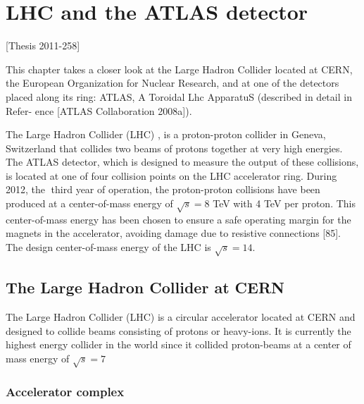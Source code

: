 \chapter{LHC and the ATLAS detector }\label{chap:lhc}

[Thesis 2011-258]

This chapter  takes a closer look at the Large Hadron Collider located at CERN,
the European Organization for Nuclear Research, and at one of the detectors placed
along its ring: ATLAS, A Toroidal Lhc ApparatuS (described in detail in Refer-
ence [ATLAS Collaboration 2008a]).


The Large Hadron Collider (LHC) \cite{lhc1}, \cite{lhc2} is a proton-proton collider in Geneva,
Switzerland that collides two beams of protons together at very high energies. The ATLAS
detector, which is designed to measure the output of these collisions, is located at one of
four collision points on the LHC accelerator ring. During 2012, the third year of operation,
the proton-proton collisions have been produced at a center-of-mass energy of $\sqrt{s}= 8$ TeV
with 4 TeV per proton. This center-of-mass energy has been chosen to ensure a safe
operating margin for the magnets in the accelerator, avoiding damage due to resistive
connections [85]. The design center-of-mass energy of the LHC is $\sqrt{s}= 14$.


\section{The Large Hadron Collider at CERN}
The Large Hadron Collider (LHC) is a circular accelerator located at CERN and designed
to collide beams consisting of protons or heavy-ions. It is currently the highest energy
collider in the world since it collided proton-beams at a center of mass energy of $\sqrt{s}= 7$

\subsection{Accelerator complex}

